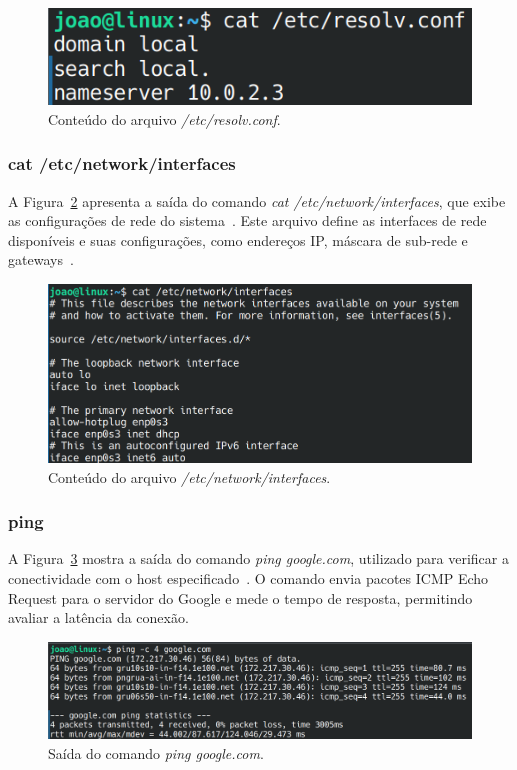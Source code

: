 \documentclass[
	12pt,				%
	oneside,   	        %
	a4paper,			%
	english,			%
	french,				%
	spanish,			%
	brazil,				%
	]{pacotes/abntex2}
\begin{document}
\begin{figure}[H]
  \centering
  \includegraphics[scale=0.37]{figuras/resolv.png}
  \caption{Conteúdo do arquivo \textit{/etc/resolv.conf}.}
  \label{fig:resolv}
\end{figure}

\subsubsection{cat /etc/network/interfaces}
A Figura~\ref{fig:interfaces} apresenta a saída do comando \textit{cat /etc/network/interfaces}, que exibe as configurações de rede do sistema~\cite{manCat}. Este arquivo define as interfaces de rede disponíveis e suas configurações, como endereços IP, máscara de sub-rede e gateways~\cite{manResolvConf}.

\begin{figure}[H]
  \centering
  \includegraphics[scale=0.37]{figuras/interfaces.png}
  \caption{Conteúdo do arquivo \textit{/etc/network/interfaces}.}
  \label{fig:interfaces}
\end{figure}

\subsubsection{ping}
A Figura~\ref{fig:ping} mostra a saída do comando \textit{ping google.com}, utilizado para verificar a conectividade com o host especificado~\cite{manPing}. O comando envia pacotes ICMP Echo Request para o servidor do Google e mede o tempo de resposta, permitindo avaliar a latência da conexão.

\begin{figure}[H]
  \centering
  \includegraphics[scale=0.37]{figuras/ping.png}
  \caption{Saída do comando \textit{ping google.com}.}
  \label{fig:ping}
\end{figure}
\end{document}
